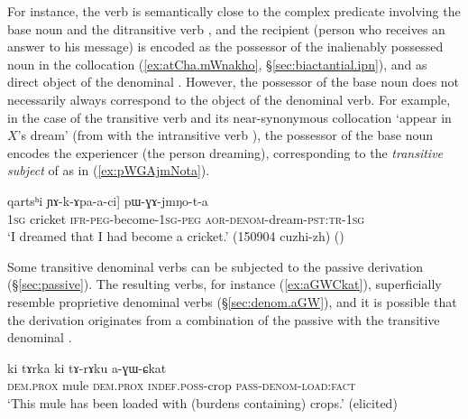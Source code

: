 For instance, the verb   is semantically close to the complex predicate involving the base noun  and the ditransitive verb , and the recipient (person who receives an answer to his message) is encoded as the possessor of the inalienably possessed noun  in the collocation (\ref{ex:atCha.mWnakho}, §\ref{sec:biactantial.ipn}), and as direct object of the denominal . However, the possessor of the base noun does not necessarily always correspond to the object of the  denominal verb. For example, in the case of the transitive verb  and its near-synonymous collocation  `appear in $X$'s dream' (from  with the intransitive verb ), the possessor of the base noun  encodes the  experiencer (the person dreaming), corresponding to the \textit{transitive subject}  of  as in (\ref{ex:pWGAjmNota}). 

\begin{exe}
\ex \label{ex:pWGAjmNota}
 \gll [aʑo [...] qartsʰi ɲɤ-k-ɤpa-a-ci] pɯ-ɣɤ-jmŋo-t-a \\
\textsc{1sg} {  } cricket \textsc{ifr}-\textsc{peg}-become-\textsc{1sg}-\textsc{peg} \textsc{aor}-\textsc{denom}-dream-\textsc{pst}:\textsc{tr}-\textsc{1sg} \\
\glt `I dreamed that I had become a cricket.' (150904 cuzhi-zh)
()
\end{exe}
 
Some transitive  denominal verbs can be subjected to the  passive derivation (§\ref{sec:passive}). The resulting verbs, for instance   (\ref{ex:aGWCkat}), superficially resemble  proprietive denominal verbs (§\ref{sec:denom.aGW}), and it is possible that the   derivation originates from a combination of the passive with the transitive denominal .
 

\begin{exe}
\ex \label{ex:aGWCkat}
 \gll ki tɤrka ki tɤ-rɤku a-ɣɯ-ɕkat \\
 \textsc{dem}.\textsc{prox} mule  \textsc{dem}.\textsc{prox} \textsc{indef}.\textsc{poss}-crop \textsc{pass}-\textsc{denom}-\textsc{load}:\textsc{fact} \\
 \glt `This mule has been loaded with (burdens containing) crops.' (elicited)
 \end{exe}
 
